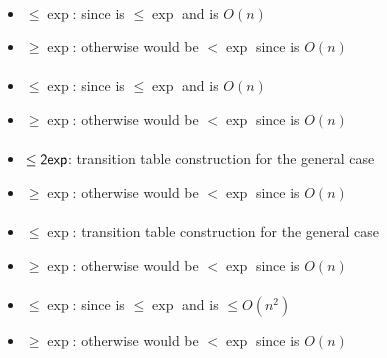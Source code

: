 \paragraph{\ODLA{}\tto\ONFA}\label{cost:1LAto1NFAu}
\begin{itemize}
	\item $\le\exp$: since \hyperref[cost:1DLAto1DFAu]{\ODLA{}\tto\ODFA} is $\le\exp$ and \ODFA{}\tto\ONFA is $O(n)$
	\item $\ge\exp$: otherwise \hyperref[cost:1DLAto2NFAu]{\ODLA{}\tto\TNFA} would be $<\exp$ since \ONFA{}\tto\TNFA is $O(n)$
\end{itemize}
\paragraph{\ODLA{}\tto\TDFA}\label{cost:1DLAto2DFAu}
\begin{itemize}
	\item $\le\exp$: since \hyperref[cost:1DLAto1DFAu]{\ODLA{}\tto\ODFA} is $\le\exp$ and \ODFA{}\tto\TDFA is $O(n)$
	\item $\ge\exp$: otherwise \hyperref[cost:1DLAto2NFAu]{\ODLA{}\tto\TNFA} would be $<\exp$ since \TDFA{}\tto\TNFA is $O(n)$
\end{itemize}
\paragraph{\OLA{}\tto\ODFA}
\begin{itemize}
	\item $\le\mathsf{2exp}$: transition table construction for the general case \cite{PigPis14}
	\item $\ge\exp$: otherwise \hyperref[cost:1DLAto1DFAu]{\ODLA{}\tto\ODFA} would be $<\exp$ since \ODLA{}\tto\OLA is $O(n)$
\end{itemize}
\paragraph{\OLA{}\tto\ONFA}\label{cost:1DLAto1NFAu}
\begin{itemize}
	\item $\le\exp$: transition table construction for the general case \cite{PigPis14}
	\item $\ge\exp$: otherwise \hyperref[cost:1DLAto1NFAu]{\OLA{}\tto\ONFA} would be $<\exp$ since \ODLA{}\tto\OLA is $O(n)$
\end{itemize}
\paragraph{\OLA{}\tto\TDFA}
\begin{itemize}
	\item $\le\exp$: since \hyperref[cost:1LAto1NFAu]{\ODLA{}\tto\ONFA} is $\le\exp$ and \hyperref[cost:1NFAto2DFAu]{\ONFA{}\tto\TDFA} is $\le O(n^2)$
	\item $\ge\exp$: otherwise \hyperref[cost:1DLAto2DFAu]{\ODLA{}\tto\TDFA} would be $<\exp$ since \ODLA{}\tto\OLA is $O(n)$
\end{itemize}
